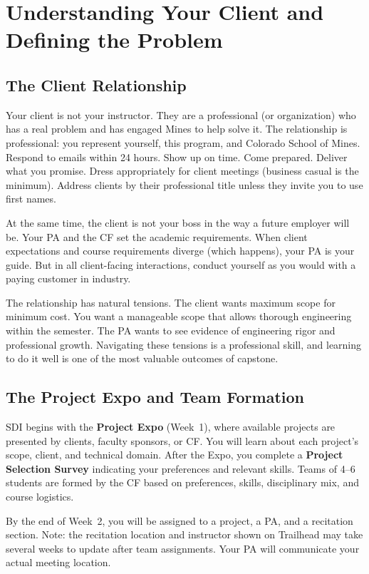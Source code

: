 \chapter{Understanding Your Client and Defining the Problem}

\section{The Client Relationship}
Your client is not your instructor. They are a professional (or organization) who has a real problem and has engaged Mines to help solve it. The relationship is professional: you represent yourself, this program, and Colorado School of Mines. Respond to emails within 24 hours. Show up on time. Come prepared. Deliver what you promise. Dress appropriately for client meetings (business casual is the minimum). Address clients by their professional title unless they invite you to use first names.

At the same time, the client is not your boss in the way a future employer will be. Your PA and the CF set the academic requirements. When client expectations and course requirements diverge (which happens), your PA is your guide. But in all client-facing interactions, conduct yourself as you would with a paying customer in industry.

The relationship has natural tensions. The client wants maximum scope for minimum cost. You want a manageable scope that allows thorough engineering within the semester. The PA wants to see evidence of engineering rigor and professional growth. Navigating these tensions is a professional skill, and learning to do it well is one of the most valuable outcomes of capstone.

\section{The Project Expo and Team Formation}
SDI begins with the \textbf{Project Expo} (Week~1), where available projects are presented by clients, faculty sponsors, or CF. You will learn about each project's scope, client, and technical domain. After the Expo, you complete a \textbf{Project Selection Survey} indicating your preferences and relevant skills. Teams of 4--6 students are formed by the CF based on preferences, skills, disciplinary mix, and course logistics.

By the end of Week~2, you will be assigned to a project, a PA, and a recitation section. Note: the recitation location and instructor shown on Trailhead may take several weeks to update after team assignments. Your PA will communicate your actual meeting location.

